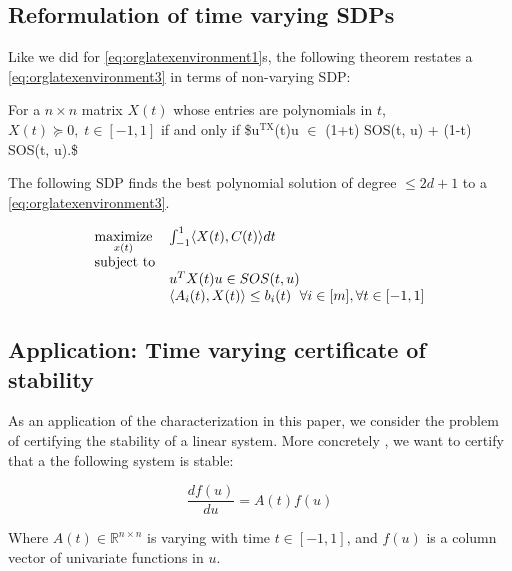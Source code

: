 \documentclass[moor]{informs1}
\begin{document}
\subsection{Reformulation of time varying SDPs}
\label{sec:orgheadline18}
\label{orgtarget9}

Like we did for \ref{eq:orglatexenvironment1}s, the following theorem restates a \ref{eq:orglatexenvironment3} in terms of non-varying SDP:

\begin{thm}

For a \(n \times n\) matrix \(X(t)\) whose entries are polynomials in \(t\), \(X(t)  \succeq 0 , \; t \in [-1, 1]\) if and only if \$u\(^{\text{TX}}\)(t)u \(\in\) (1+t) SOS(t, u) + (1-t) SOS(t, u).\$
\end{thm}


\begin{thm}
The following SDP finds the best polynomial solution of degree \(\le 2d+1\) to a \ref{eq:orglatexenvironment3}.

\begin{equation*}
\begin{array}{ll@{}ll}
\underset{x(t)}{\text{maximize}} & \int_{-1}^1 \langle X(t), C(t) \rangle dt & \\
\text{subject to}\\& u^TX(t)u \in SOS(t, u)\\
& \langle A_i(t), X(t) \rangle \le b_i(t) & \forall i \in [m], \forall t \in [-1, 1]
\end{array}
\end{equation*}
\end{thm}
\newpage




\subsection{Application: Time varying certificate of stability}
\label{sec:orgheadline19}

As an application of the characterization in this paper, we consider the problem of certifying the stability of a linear system.
More concretely , we want to certify that a the following system is stable:

$$\frac{d f(u)}{du} = A(t) f(u)$$

Where \(A(t) \in \mathbb R^{n \times n}\) is varying with time \(t \in [-1, 1]\), and \(f(u)\) is a column vector of univariate functions in \(u\).
\end{document}
